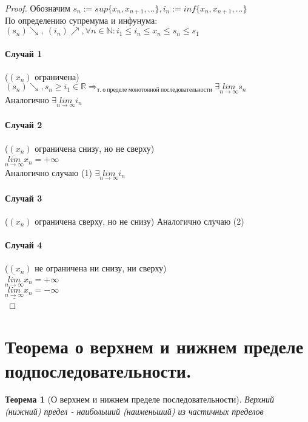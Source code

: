 \documentclass[11pt,a4paper,titlepage]{article}
\newtheorem*{theorem}{Теорема}
\renewcommand{\lim}[2]{\underset{#1 \rightarrow #2}{lim}}
\newcommand{\limn}{\lim{n}{\infty}}
\renewcommand{\implies}{\Rightarrow}
\newcommand{\limsupn}{\overline{\limn}}
\newcommand{\liminfn}{\underline{\limn}}
\newcommand{\R}{\mathbb{R}}
\newcommand{\N}{\mathbb{N}}
\begin{document}
    \begin{proof}
        Обозначим $s_n := sup\{x_n, x_{n+1}, ...\}, i_n := inf\{x_n, x_{n+1}, ...\}$\\
        По определению супремума и инфунума: $(s_n)\searrow,\ (i_n)\nearrow, \forall n \in \N: i_1 \leq i_n \leq x_n \leq s_n \leq s_1$\\

        \paragraph{Случай 1}($(x_n)$ ограничена)\\
        $(s_n) \searrow, s_n \geq i_1 \in \R \implies_{т.\ о\ пределе\ монотонной\ последовательности} \exists \limn s_n$\\
        Аналогично $\exists \limn i_n$

        \paragraph{Случай 2}($(x_n)$ ограничена снизу, но не сверху)\\
        $\limsupn x_n = +\infty$\\
        Аналогично случаю (1) $\exists \limn i_n$

        \paragraph{Случай 3}($(x_n)$ ограничена сверху, но не снизу) Аналогично случаю (2)

        \paragraph{Случай 4}($(x_n)$ не ограничена ни снизу, ни сверху)\\
        $\limsupn x_n = +\infty$\\
        $\liminfn x_n = -\infty$\\
    \end{proof}


    \section{Теорема о верхнем и нижнем пределе подпоследовательности.}

    \begin{theorem}[О верхнем и нижнем пределе последовательности]
        Верхний (нижний) предел - наибольший (наименьший) из частичных пределов
    \end{theorem}
\end{document}

